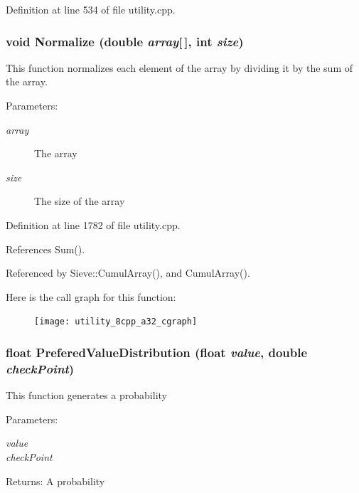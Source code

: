 Definition at line 534 of file utility.cpp.
\subsubsection{\setlength{\rightskip}{0pt plus 5cm}void Normalize (double {\em array}[$\,$], int {\em size})}\label{utility_8cpp_a32}


This function normalizes each element of the array by dividing it by the sum of the array. \begin{Desc}
\item[Parameters:]
\begin{description}
\item[{\em array}]The array \item[{\em size}]The size of the array \end{description}
\end{Desc}


Definition at line 1782 of file utility.cpp.

References Sum().

Referenced by Sieve::Cumul\-Array(), and Cumul\-Array().

Here is the call graph for this function:\begin{figure}[H]
\begin{center}
\leavevmode
\texttt{[image: utility\_8cpp\_a32\_cgraph]}
\end{center}
\end{figure}
\subsubsection{\setlength{\rightskip}{0pt plus 5cm}float Prefered\-Value\-Distribution (float {\em value}, double {\em check\-Point})}\label{utility_8cpp_a24}


This function generates a probability \begin{Desc}
\item[Parameters:]
\begin{description}
\item[{\em value}]\item[{\em check\-Point}]\end{description}
\end{Desc}
\begin{Desc}
\item[Returns:]A probability \end{Desc}


